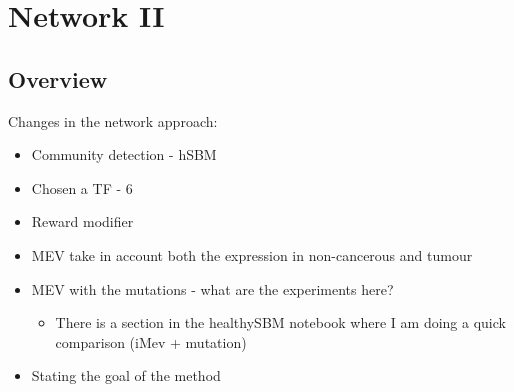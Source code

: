 
\section{Network II} \label{s:N_II}

\subsection{Overview}


Changes in the network approach:
\begin{itemize}
    \item Community detection - hSBM
    \item Chosen a TF - 6
    \item Reward modifier
    \item MEV take in account both the expression in non-cancerous and tumour
    \item MEV with the mutations - what are the experiments here?
    \begin{itemize}
        \item There is a section in the healthySBM notebook where I am doing a quick comparison (iMev + mutation)
    \end{itemize}
    \item Stating the goal of the method
\end{itemize}

\newpage

